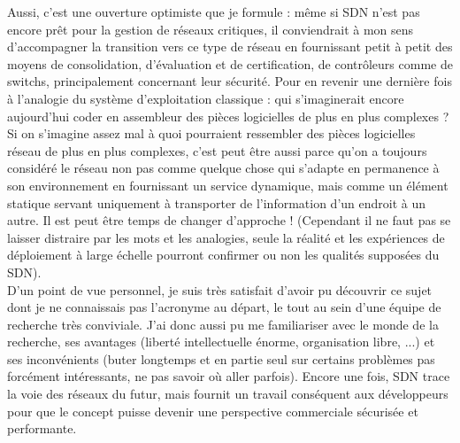Aussi, c'est une ouverture optimiste que je formule : même si SDN n'est pas encore prêt pour la gestion de réseaux critiques, il conviendrait à mon sens d'accompagner la transition vers ce type de réseau en fournissant petit à petit des moyens de consolidation, d'évaluation et de certification, de contrôleurs comme de switchs, principalement concernant leur sécurité. Pour en revenir une dernière fois à l'analogie du système d'exploitation classique : qui s'imaginerait encore aujourd'hui coder en assembleur des pièces logicielles de plus en plus complexes ? Si on s'imagine assez mal à quoi pourraient ressembler des pièces logicielles réseau de plus en plus complexes, c'est peut être aussi parce qu'on a toujours considéré le réseau non pas comme quelque chose qui s'adapte en permanence à son environnement en fournissant un service dynamique, mais comme un élément statique servant uniquement à transporter de l'information d'un endroit à un autre. Il est peut être temps de changer d'approche ! (Cependant il ne faut pas se laisser distraire par les mots et les analogies, seule la réalité et les expériences de déploiement à large échelle pourront confirmer ou non les qualités supposées du SDN).\\

D’un point de vue personnel, je suis très satisfait d'avoir pu découvrir ce sujet dont je ne connaissais pas l'acronyme au départ, le tout au sein d'une équipe de recherche très conviviale. J'ai donc aussi pu me familiariser avec le monde de la recherche, ses avantages (liberté intellectuelle énorme, organisation libre, ...) et ses inconvénients (buter longtemps et en partie seul sur certains problèmes pas forcément intéressants, ne pas savoir où aller parfois). Encore une fois, SDN trace la voie des réseaux du futur, mais fournit un travail conséquent aux développeurs pour que le concept puisse devenir une perspective commerciale sécurisée et performante.